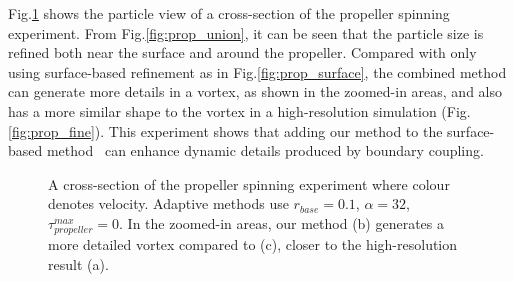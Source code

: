 \documentclass[VANCOUVER,STIX1COL]{WileyNJD-v2}
\begin{document}
Fig.\ref{fig:prop} shows the particle view of a cross-section of the propeller spinning experiment. From Fig.\ref{fig:prop_union}, it can be seen that the particle size is refined both near the surface and around the propeller. Compared with only using surface-based refinement as in Fig.\ref{fig:prop_surface}, the combined method can generate more details in a vortex, as shown in the zoomed-in areas, and also has a more similar shape to the vortex in a high-resolution simulation (Fig.\ref{fig:prop_fine}). This experiment shows that adding our method to the surface-based method~\cite{Winchenbach17} can enhance dynamic details produced by boundary coupling.

\begin{figure}[htbp]

\centering
{}
\vspace{-0.7\baselineskip}
\caption{
A cross-section of the propeller spinning experiment where colour denotes velocity. Adaptive methods use $r_{base} = 0.1$, $\alpha = 32$, $\tau^{max}_{propeller} = 0$. In the zoomed-in areas, our method (b) generates a more detailed vortex compared to (c), closer to the high-resolution result (a).
}
\label{fig:prop}

\end{figure}
\end{document}
